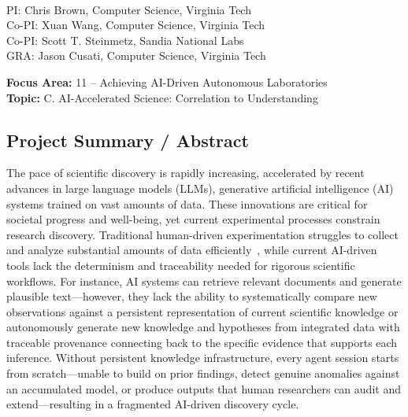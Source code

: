 \documentclass{files/proposalnsf}
\begin{document}
\begin{center}
    \large{\proposalEleven} \\ \vspace{0.5pt}
\footnotesize{PI: Chris Brown, Computer Science, Virginia Tech} \\
\footnotesize{Co-PI: Xuan Wang, Computer Science, Virginia Tech} \\
\footnotesize{Co-PI: Scott T. Steinmetz, Sandia National Labs} \\
\footnotesize{GRA: Jason Cusati, Computer Science, Virginia Tech}
\end{center}

\small{\noindent\textbf{Focus Area:} 11 -- Achieving AI-Driven Autonomous Laboratories} \hfill \\
\small{\textbf{Topic:} C. AI-Accelerated Science: Correlation to Understanding}

\subsection*{Project Summary / Abstract}

The pace of scientific discovery is rapidly increasing, accelerated by recent advances in large language models (LLMs), generative artificial intelligence (AI) systems trained on vast amounts of data. These innovations are critical for societal progress and well-being, yet current experimental processes constrain research discovery. Traditional human-driven experimentation struggles to collect and analyze substantial amounts of data efficiently~\cite{}, while current AI-driven tools lack the determinism and traceability needed for rigorous scientific workflows. For instance, AI systems can retrieve relevant documents and generate plausible text---however, they lack the ability to systematically compare new observations against a persistent representation of current scientific knowledge or autonomously generate new knowledge and hypotheses from integrated data with traceable provenance connecting back to the specific evidence that supports each inference. Without persistent knowledge infrastructure, every agent session starts from scratch---unable to build on prior findings, detect genuine anomalies against an accumulated model, or produce outputs that human researchers can audit and extend---resulting in a fragmented AI-driven discovery cycle.
\end{document}
